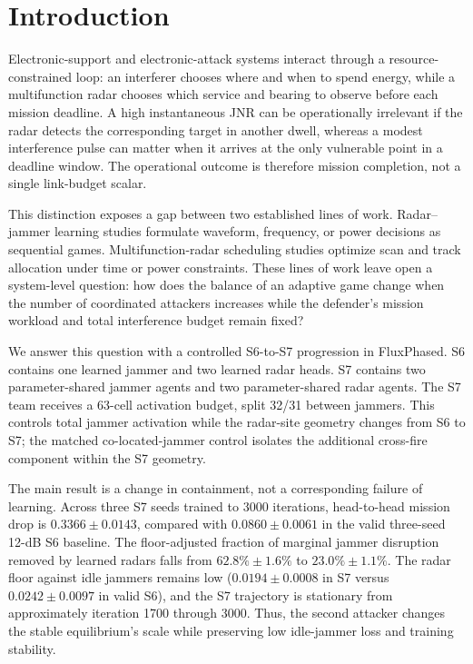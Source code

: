 \section{Introduction}
Electronic-support and electronic-attack systems interact through a resource-constrained loop: an interferer chooses where and when to spend energy, while a multifunction radar chooses which service and bearing to observe before each mission deadline. A high instantaneous JNR can be operationally irrelevant if the radar detects the corresponding target in another dwell, whereas a modest interference pulse can matter when it arrives at the only vulnerable point in a deadline window. The operational outcome is therefore mission completion, not a single link-budget scalar.

This distinction exposes a gap between two established lines of work. Radar--jammer learning studies formulate waveform, frequency, or power decisions as sequential games. Multifunction-radar scheduling studies optimize scan and track allocation under time or power constraints. These lines of work leave open a system-level question: how does the balance of an adaptive game change when the number of coordinated attackers increases while the defender's mission workload and total interference budget remain fixed?

We answer this question with a controlled S6-to-S7 progression in FluxPhased. S6 contains one learned jammer and two learned radar heads. S7 contains two parameter-shared jammer agents and two parameter-shared radar agents. The S7 team receives a 63-cell activation budget, split 32/31 between jammers. This controls total jammer activation while the radar-site geometry changes from S6 to S7; the matched co-located-jammer control isolates the additional cross-fire component within the S7 geometry.

The main result is a change in containment, not a corresponding failure of learning. Across three S7 seeds trained to 3000 iterations, head-to-head mission drop is $0.3366\pm0.0143$, compared with $0.0860\pm0.0061$ in the valid three-seed 12-dB S6 baseline. The floor-adjusted fraction of marginal jammer disruption removed by learned radars falls from $62.8\%\pm1.6\%$ to $23.0\%\pm1.1\%$. The radar floor against idle jammers remains low ($0.0194\pm0.0008$ in S7 versus $0.0242\pm0.0097$ in valid S6), and the S7 trajectory is stationary from approximately iteration 1700 through 3000. Thus, the second attacker changes the stable equilibrium's scale while preserving low idle-jammer loss and training stability.

